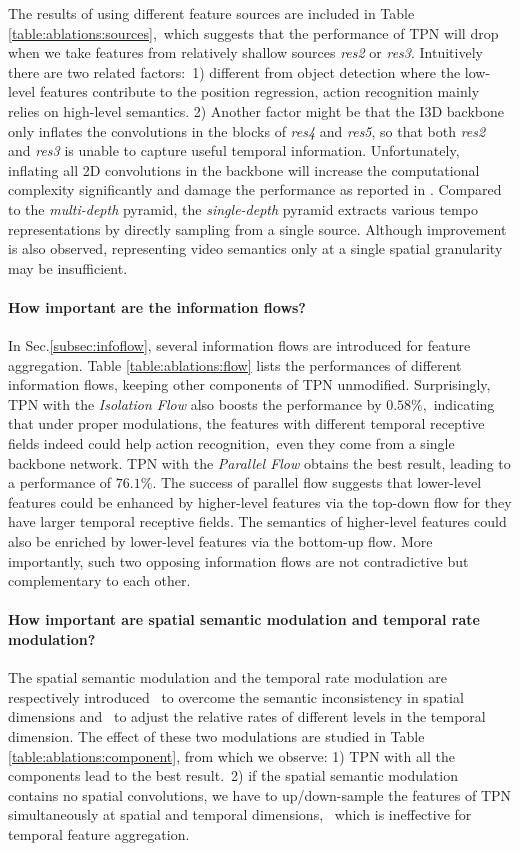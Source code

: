 \documentclass[10pt,twocolumn,letterpaper]{article}
\begin{document}
The results of using different feature sources are included in Table \ref{table:ablations:sources},\
which suggests that the performance of TPN will drop when we take features from relatively shallow sources \eg \emph{res2} or \emph{res3}.
Intuitively there are two related factors:\
1) different from object detection where the low-level features contribute to the position regression, action recognition mainly relies on high-level semantics.
2) Another factor might be that the I3D backbone \cite{slowfast} only inflates the convolutions in the blocks of \emph{res4} and \emph{res5},
so that both \emph{res2} and \emph{res3} is unable to capture useful temporal information.
Unfortunately, inflating all 2D convolutions in the backbone will increase the computational complexity significantly and damage the performance as reported in \cite{slowfast}.
Compared to the \emph{multi-depth} pyramid, the \emph{single-depth} pyramid extracts various tempo representations by directly sampling from a single source.
Although improvement is also observed, representing video semantics only at a single spatial granularity may be insufficient.


\paragraph{How important are the information flows?}
In Sec.\ref{subsec:infoflow}, several information flows are introduced for feature aggregation.
Table \ref{table:ablations:flow} lists the performances of different information flows, keeping other components of TPN unmodified.
Surprisingly, TPN with the \emph{Isolation Flow} also boosts the performance by $0.58\%$,\
indicating that under proper modulations, the features with different temporal receptive fields indeed could help action recognition,\
even they come from a single backbone network.
TPN with the \emph{Parallel Flow} obtains the best result, leading to a performance of $76.1\%$.
The success of parallel flow suggests that lower-level features could be enhanced by higher-level features via the top-down flow for they have larger temporal receptive fields.
The semantics of higher-level features could also be enriched by lower-level features via the bottom-up flow.
More importantly, such two opposing information flows are not contradictive but complementary to each other.



\paragraph{How important are spatial semantic modulation and temporal rate modulation?}
The spatial semantic modulation and the temporal rate modulation are respectively introduced \
to overcome the semantic inconsistency in spatial dimensions and \
to adjust the relative rates of different levels in the temporal dimension.
The effect of these two modulations are studied in Table \ref{table:ablations:component}, from which we observe:
1) TPN with all the components lead to the best result.\
2) if the spatial semantic modulation contains no spatial convolutions, we have to up/down-sample the features of TPN simultaneously at spatial and temporal dimensions, \
which is ineffective for temporal feature aggregation.
\end{document}
